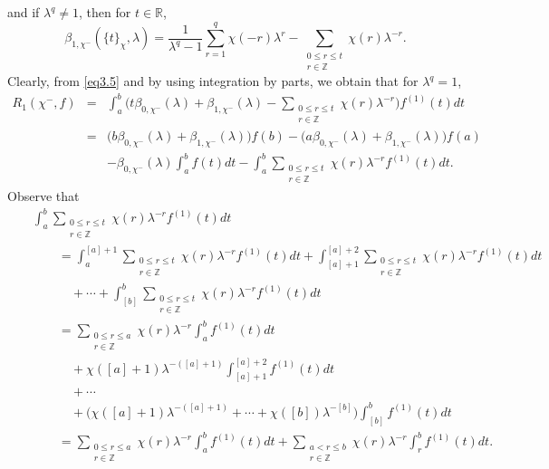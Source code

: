\documentclass[reqno]{amsart}
\numberwithin{equation}{section}
\begin{document}
and if $\lambda^{q}\neq1$, then for $t\in\mathbb{R}$,
\begin{equation}\label{eq3.6}
\beta_{1,\chi^{-}}(\{t\}_{\chi},\lambda)=\frac{1}{\lambda^{q}-1}\sum_{r=1}^{q}\chi(-r)\lambda^{r}-\underset{\substack{0\leqslant r\leqslant t\\ r\in\mathbb{Z}}}{\sum}\chi(r)\lambda^{-r}.
\end{equation}
Clearly, from \eqref{eq3.5} and by using integration by parts, we obtain that for $\lambda^{q}=1$,
\begin{eqnarray}\label{eq3.7}
R_{1}(\chi^{-},f)&=&\int_{a}^{b}\bigl(t\beta_{0,\chi^{-}}(\lambda)+\beta_{1,\chi^{-}}(\lambda)-\underset{\substack{0\leqslant r\leqslant t\\ r\in\mathbb{Z}}}{\sum}\chi(r)\lambda^{-r}\bigl)f^{(1)}(t)dt\nonumber\\
&=&\bigl(b\beta_{0,\chi^{-}}(\lambda)+\beta_{1,\chi^{-}}(\lambda)\bigl)f(b)-\bigl(a\beta_{0,\chi^{-}}(\lambda)+\beta_{1,\chi^{-}}(\lambda)\bigl)f(a)\nonumber\\
&&-\beta_{0,\chi^{-}}(\lambda)\int_{a}^{b}f(t)dt-\int_{a}^{b}\underset{\substack{0\leqslant r\leqslant t\\ r\in\mathbb{Z}}}{\sum}\chi(r)\lambda^{-r}f^{(1)}(t)dt.
\end{eqnarray}
Observe that
\begin{eqnarray}\label{eq3.8}
&&\int_{a}^{b}\underset{\substack{0\leqslant r\leqslant t\\ r\in\mathbb{Z}}}{\sum}\chi(r)\lambda^{-r}f^{(1)}(t)dt\nonumber\\
&&\qquad=\int_{a}^{[a]+1}\underset{\substack{0\leqslant r\leqslant t\\ r\in\mathbb{Z}}}{\sum}\chi(r)\lambda^{-r}f^{(1)}(t)dt+\int_{[a]+1}^{[a]+2}\underset{\substack{0\leqslant r\leqslant t\\ r\in\mathbb{Z}}}{\sum}\chi(r)\lambda^{-r}f^{(1)}(t)dt\nonumber\\
&&\qquad\quad+\cdots+\int_{[b]}^{b}\underset{\substack{0\leqslant r\leqslant t\\ r\in\mathbb{Z}}}{\sum}\chi(r)\lambda^{-r}f^{(1)}(t)dt\nonumber\\
&&\qquad=\underset{\substack{0\leqslant r\leqslant a\\ r\in\mathbb{Z}}}{\sum}\chi(r)\lambda^{-r}\int_{a}^{b}f^{(1)}(t)dt\nonumber\\
&&\qquad\quad+\chi([a]+1)\lambda^{-([a]+1)}\int_{[a]+1}^{[a]+2}f^{(1)}(t)dt\nonumber\\
&&\qquad\quad+\cdots\nonumber\\
&&\qquad\quad+\bigl(\chi([a]+1)\lambda^{-([a]+1)}+\cdots+\chi([b])\lambda^{-[b]}\bigl)\int_{[b]}^{b}f^{(1)}(t)dt\nonumber\\
&&\qquad=\underset{\substack{0\leqslant r\leqslant a\\ r\in\mathbb{Z}}}{\sum}\chi(r)\lambda^{-r}\int_{a}^{b}f^{(1)}(t)dt+\underset{\substack{a<r\leqslant b\\ r\in\mathbb{Z}}}{\sum}\chi(r)\lambda^{-r}\int_{r}^{b}f^{(1)}(t)dt.
\end{eqnarray}
\end{document}
